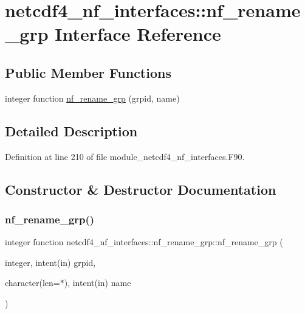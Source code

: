 \hypertarget{interfacenetcdf4__nf__interfaces_1_1nf__rename__grp}{}\section{netcdf4\+\_\+nf\+\_\+interfaces\+:\+:nf\+\_\+rename\+\_\+grp Interface Reference}
\label{interfacenetcdf4__nf__interfaces_1_1nf__rename__grp}
\subsection*{Public Member Functions}
\begin{DoxyCompactItemize}
\item 
integer function \hyperlink{interfacenetcdf4__nf__interfaces_1_1nf__rename__grp_a042302c1ea2d3fdf3ee05ef67760433f}{nf\+\_\+rename\+\_\+grp} (grpid, name)
\end{DoxyCompactItemize}


\subsection{Detailed Description}


Definition at line 210 of file module\+\_\+netcdf4\+\_\+nf\+\_\+interfaces.\+F90.



\subsection{Constructor \& Destructor Documentation}
\mbox{\label{interfacenetcdf4__nf__interfaces_1_1nf__rename__grp_a042302c1ea2d3fdf3ee05ef67760433f}} 
\subsubsection{\texorpdfstring{nf\+\_\+rename\+\_\+grp()}{nf\_rename\_grp()}}
{\footnotesize\ttfamily integer function netcdf4\+\_\+nf\+\_\+interfaces\+::nf\+\_\+rename\+\_\+grp\+::nf\+\_\+rename\+\_\+grp (\begin{DoxyParamCaption}\item[{integer, intent(in)}]{grpid,  }\item[{character(len=$\ast$), intent(in)}]{name }\end{DoxyParamCaption})}



